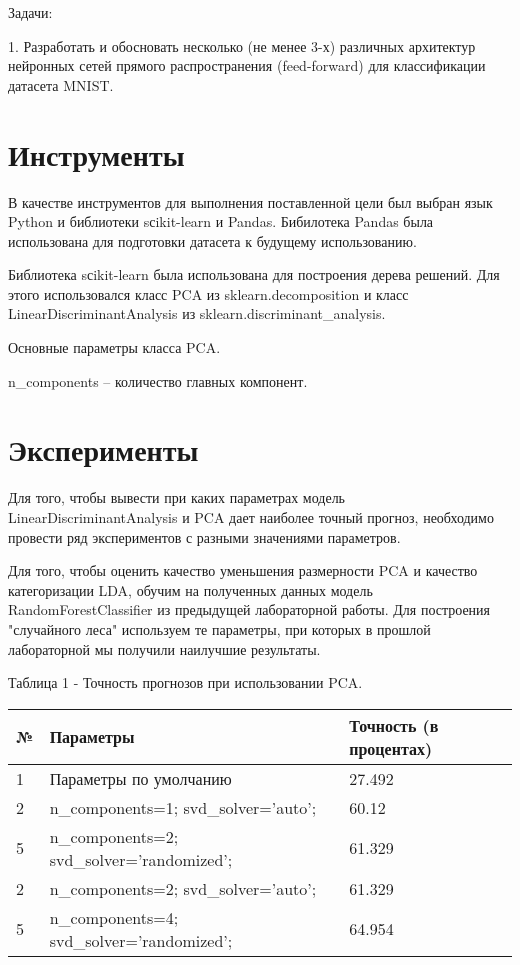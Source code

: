 \documentclass[a4paper,12pt]{article}
\begin{document}
	\vspace{0.5cm}
	Задачи: 
	
	\vspace{0.5cm}
	1. Разработать и обосновать несколько (не менее 3-х) различных архитектур нейронных сетей прямого распространения (feed-forward) для классификации датасета MNIST.
	
	
\newpage\section{Инструменты} 
	В качестве инструментов для выполнения поставленной цели был выбран язык Python и библиотеки sсikit-learn и Pandas.
	Бибилотека Pandas была использована для подготовки датасета к будущему использованию.
	
	\vspace{0.5cm}
	Библиотека sсikit-learn была использована для построения дерева решений. Для этого использовался класс PCA из sklearn.decomposition и класс LinearDiscriminantAnalysis из sklearn.discriminant\_analysis.
	
	\vspace{0.5cm}
	Основные параметры класса PCA.
	
	\vspace{0.5cm}
	n\_components – количество главных компонент.

	
\newpage\section{Эксперименты}
	Для того, чтобы вывести при каких параметрах модель LinearDiscriminantAnalysis и PCA дает наиболее точный прогноз, необходимо провести ряд экспериментов с разными значениями параметров. 
	
	\vspace{0.5cm}
	Для того, чтобы оценить качество уменьшения размерности PCA и качество категоризации LDA,  обучим на полученных данных модель RandomForestClassifier из предыдущей лабораторной работы. Для построения "случайного леса" используем те параметры, при которых в прошлой лабораторной мы получили наилучшие результаты.


	\vspace{0.5cm}
	Таблица 1 - Точность прогнозов  при использовании PCA.
\begin{longtable}{|p{1cm}|p{9cm}|p{3cm}|}
\hline
№ & Параметры & Точность (в процентах) \\ 
\hline 
1 & Параметры по умолчанию & 27.492 \\
\hline
2 & n\_components=1; svd\_solver='auto';  & 60.12 \\
\hline 
5 & n\_components=2; svd\_solver='randomized';& 61.329 \\
\hline
2 & n\_components=2; svd\_solver='auto';  & 61.329 \\
\hline 
5 & n\_components=4; svd\_solver='randomized'; & 64.954 \\
\hline
\end{longtable}
\end{document}
